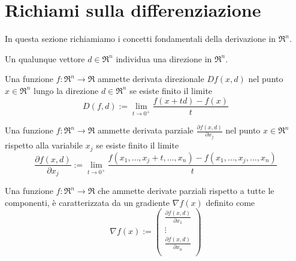 \chapter{Richiami sulla differenziazione}
\label{chp:foundations-derivation}
In questa sezione richiamiamo i concetti fondamentali della derivazione in $\Re^{n}$.

Un qualunque vettore $d\in\Re^{n}$ individua una direzione in $\Re^{n}$.

\begin{definition}
	\label{dfn:directional-derivation}
	Una funzione $f:\Re^{n}\rightarrow\Re$ ammette derivata direzionale $Df(x,d)$ nel punto $x\in\Re^{n}$ lungo la direzione $d \in\Re^{n}$ se esiste finito il limite
	\begin{equation}
	\label{eqn:directional-derivation}
		D(f,d):=\lim_{t\rightarrow0^{+}}\frac{f(x+td)-f(x)}{t}
	\end{equation}
\end{definition}

\begin{definition}
	\label{dfn:partial-derivation}
	Una funzione $f:\Re^{n}\rightarrow\Re$ ammette derivata parziale $\frac{\partial f(x,d)}{\partial x_{j}}$ nel punto $x\in\Re^{n}$ rispetto alla variabile $x_{j}$ se esiste finito il limite
	\begin{equation}
	\label{eqn:partial-derivation}
	\frac{\partial f(x,d)}{\partial x_{j}}:=\lim_{t\rightarrow0^{+}}\frac{f(x_{1},\ldots,x_{j}+t,\ldots,x_{n})-f(x_{1},\ldots,x_{j},\ldots,x_{n})}{t}
	\end{equation}
\end{definition}

\begin{definition}[Gradiente]
	\label{dfn:gradient}
	Una funzione $f:\Re^{n}\rightarrow\Re$ che ammette derivate parziali rispetto a tutte le componenti, è caratterizzata da un gradiente $\nabla f(x)$ definito come
	\begin{equation}
	\label{eqn:gradient}
	\nabla f(x):=
	\begin{pmatrix}
	\frac{\partial f(x,d)}{\partial x_{1}} \\
	\vdots \\
	\frac{\partial f(x,d)}{\partial x_{n}} \\
	\end{pmatrix}
	\end{equation}
\end{definition}


